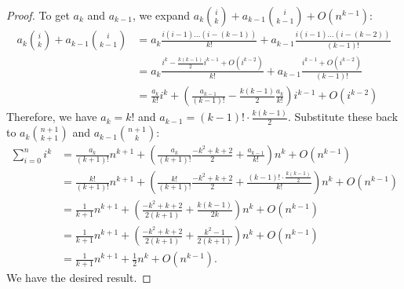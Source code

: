 \documentclass[../main.tex]{subfiles}
\begin{document}
\begin{proof}
    To get $a_k$ and $a_{k - 1}$, we expand $a_k {i \choose k} + a_{k-1} {i \choose k - 1} + O(n^{k-1})$:
    \begin{align*}
        a_k {i \choose k} + a_{k-1} {i \choose k - 1} &= a_k \frac{i(i - 1) \dots (i - (k - 1))}{k!} + a_{k - 1} \frac{i(i - 1) \dots (i - (k - 2))}{(k - 1)!}\\
                                                      &= a_k \frac{i^k - \frac{k (k-1)}{2} i^{k-1} + O(i^{k-2})}{k!} + a_{k-1} \frac{i^{k-1} + O(i^{k-2})}{(k - 1)!}\\
                                                      &= \frac{a_k}{k!} i^k + \left( \frac{a_{k-1}}{(k-1)!} - \frac{k(k-1)}{2}\frac{a_k}{k!} \right) i^{k-1} + O(i^{k-2})
    \end{align*}
    Therefore, we have $a_k = k!$ and $a_{k-1} = (k-1)! \cdot \frac{k(k-1)}{2}$.
    Substitute these back to $a_k {n + 1 \choose k + 1}$ and $a_{k-1} {n + 1 \choose k}$:
    \begin{align*}
        \sum_{i = 0}^n i^k &= \frac{a_k}{(k + 1)!} n^{k + 1} + \left( \frac{a_k}{(k + 1)!} \frac{- k^2 + k + 2}{2} + \frac{a_{k-1}}{k!}\right) n^k + O(n^{k-1})\\
                           &= \frac{k!}{(k + 1)!} n^{k + 1} + \left( \frac{k!}{(k + 1)!} \frac{- k^2 + k + 2}{2} + \frac{(k-1)! \cdot \frac{k(k-1)}{2}}{k!}\right) n^k + O(n^{k-1})\\
                           &= \frac{1}{k+1} n^{k + 1} + \left( \frac{-k^2 + k + 2}{2(k + 1)} + \frac{k(k-1)}{2k}\right) n^k + O(n^{k-1})\\
                           &= \frac{1}{k+1} n^{k + 1} + \left( \frac{-k^2 + k + 2}{2(k + 1)} + \frac{k^2-1}{2(k + 1)}\right) n^k + O(n^{k-1})\\
                           &= \frac{1}{k+1} n^{k + 1} + \frac 12 n^k + O(n^{k-1}).
    \end{align*}
    We have the desired result.

\end{proof}
\end{document}
